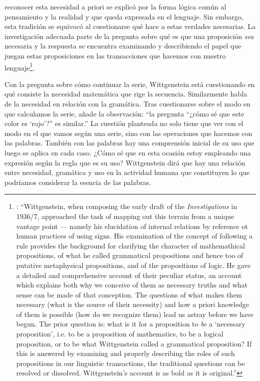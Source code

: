 reconocer esta necesidad a priori se explicó por la forma lógica común al pensamiento y la realidad y que queda expresada en el lenguaje. Sin embargo, esta tradición se equivocó al cuestionarse qué hace a estas verdades necesarias. La investigación adecuada parte de la pregunta sobre qué es que una proposición \emph{sea} necesaria y la respuesta se encuentra examinando y describiendo el papel que juegan estas proposiciones en las transacciones que hacemos con nuestro lenguaje\footnote{\cite[Cf.~][242-243]{bakerhacker2014rules}: \enquote{Wittgenstein, when composing the early draft of the \emph{Investigations} in 1936/7, approached the task of mapping out this terrain from a unique vantage point --- namely his elucidation of internal relations by reference ot human practices of using signs. His examination of the concept of following a rule provides the background for clarifying the character of mathemathical propositions, of what he called grammatical propositions and hence too of putative metaphysical propositions, and of the propositions of logic. He gave a detailed and comprehensive account of their peculiar status, an account which explains both why we conceive of them as necessary truths and what sense can be made of that conception. The questions of what makes them necessary (what is the source of their necessity) and how a priori knowledge of them is possible (how do we recognize them) lead us astray before we have begun. The prior question is: what is it for a proposition to \emph{be} a `necessary proposition', i.e. to be a proposition of mathematics, to be a logical proposition, or to be what Wittgenstein called a grammatical proposition? If this is answered by examining and properly describing the roles of such propositions in our linguistic transactions, the traditional questions can be resolved or dissolved. Wittgenstein's account is as bold as it is original.}}.

Con la pregunta sobre cómo continuar la serie, Wittgenstein está cuestionando en qué consiste la necesidad matemática que rige la secuencia. Similarmente habla de la necesidad en relación con la gramática. Tras cuestionarse sobre el modo en que calculamos la serie, añade la observación: \enquote{la pregunta ``¿cómo sé que este color es `rojo'?'' es similar.} La cuestión planteada no solo tiene que ver con el modo en el que vamos según una serie, sino con las operaciones que hacemos con las palabras. También con las palabras hay una comprensión inicial de su uso que luego se aplica en cada caso. ¿Cómo sé que en esta ocasión estoy empleando una expresión según la regla que es su uso? Wittgenstein dirá que hay una relación entre necesidad, gramática y uso en la actividad humana que constituyen lo que podríamos considerar la esencia de las palabras.

